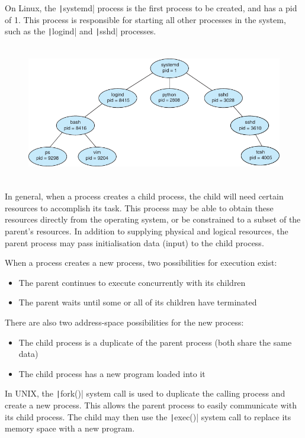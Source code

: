 \documentclass{article}
\begin{document}
On Linux, the \texttt|systemd| process is the first process
to be created, and has a pid of 1. This process is responsible for
starting all other processes in the system, such as the
\texttt|logind| and \texttt|sshd| processes.
\begin{figure}[H]
    \centering
    \includegraphics[height = 6cm]{figures/linux_process_tree.pdf}
\end{figure}
In general, when a process creates a child process, the child will
need certain resources to accomplish its task.
This process may be able to obtain these resources directly from the
operating system, or be constrained to a subset of the parent's
resources.
In addition to supplying physical and logical resources, the parent
process may pass initialisation data (input) to the child process.

When a process creates a new process, two possibilities for execution
exist:
\begin{itemize}
    \item The parent continues to execute concurrently with its
          children
    \item The parent waits until some or all of its children have
          terminated
\end{itemize}
There are also two address-space possibilities for
the new process:
\begin{itemize}
    \item The child process is a duplicate of the parent process (both
          share the same data)
    \item The child process has a new program loaded into it
\end{itemize}
In UNIX,
the \texttt|fork()| system call is used to
duplicate the calling process and create a new
process.
This allows the parent process to easily communicate with its child
process.
The child may then use the \texttt|exec()| system call to
replace its memory space with a new program.
\end{document}
